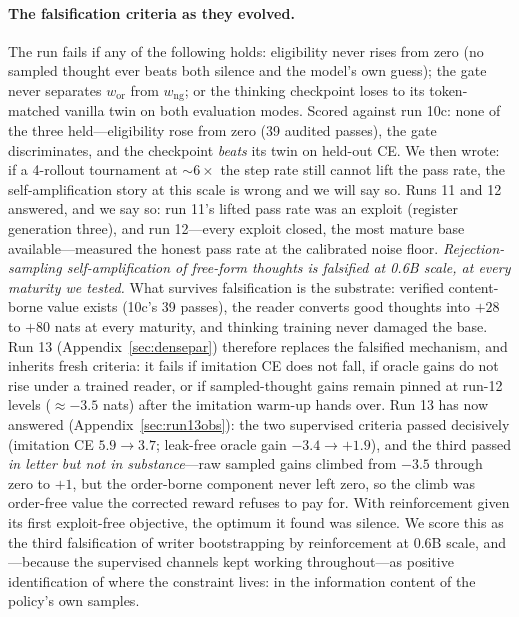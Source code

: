 \documentclass{article} %
\begin{document}
\paragraph{The falsification criteria as they evolved.} The run fails if any of the following holds: eligibility never rises from zero (no sampled thought ever beats both silence and the model's own guess); the gate never separates $w_{\mathrm{or}}$ from $w_{\mathrm{ng}}$; or the thinking checkpoint loses to its token-matched vanilla twin on both evaluation modes. Scored against run 10c: none of the three held---eligibility rose from zero (39 audited passes), the gate discriminates, and the checkpoint \emph{beats} its twin on held-out CE. We then wrote: if a 4-rollout tournament at ${\sim}6\times$ the step rate still cannot lift the pass rate, the self-amplification story at this scale is wrong and we will say so. Runs 11 and 12 answered, and we say so: run 11's lifted pass rate was an exploit (register generation three), and run 12---every exploit closed, the most mature base available---measured the honest pass rate at the calibrated noise floor. \emph{Rejection-sampling self-amplification of free-form thoughts is falsified at 0.6B scale, at every maturity we tested.} What survives falsification is the substrate: verified content-borne value exists (10c's 39 passes), the reader converts good thoughts into $+28$ to $+80$ nats at every maturity, and thinking training never damaged the base. Run 13 (Appendix~\ref{sec:densepar}) therefore replaces the falsified mechanism, and inherits fresh criteria: it fails if imitation CE does not fall, if oracle gains do not rise under a trained reader, or if sampled-thought gains remain pinned at run-12 levels ($\approx -3.5$ nats) after the imitation warm-up hands over. Run 13 has now answered (Appendix~\ref{sec:run13obs}): the two supervised criteria passed decisively (imitation CE $5.9 \to 3.7$; leak-free oracle gain $-3.4 \to +1.9$), and the third passed \emph{in letter but not in substance}---raw sampled gains climbed from $-3.5$ through zero to $+1$, but the order-borne component never left zero, so the climb was order-free value the corrected reward refuses to pay for. With reinforcement given its first exploit-free objective, the optimum it found was silence. We score this as the third falsification of writer bootstrapping by reinforcement at 0.6B scale, and---because the supervised channels kept working throughout---as positive identification of where the constraint lives: in the information content of the policy's own samples.
\end{document}
